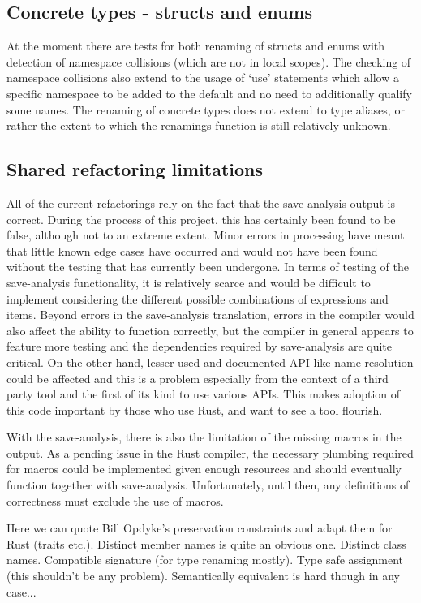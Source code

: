 \subsection{Concrete types - structs and enums}
At the moment there are tests for both renaming of structs and enums with detection of namespace collisions (which are not in local scopes). The checking of namespace collisions also extend to the usage of `use' statements which allow a specific namespace to be added to the default and no need to additionally qualify some names. The renaming of concrete types does not extend to type aliases, or rather the extent to which the renamings function is still relatively unknown.

\subsection{Shared refactoring limitations}
All of the current refactorings rely on the fact that the save-analysis output is correct. During the process of this project, this has certainly been found to be false, although not to an extreme extent. Minor errors in processing have meant that little known edge cases have occurred and would not have been found without the testing that has currently been undergone. In terms of testing of the save-analysis functionality, it is relatively scarce and would be difficult to implement considering the different possible combinations of expressions and items. Beyond errors in the save-analysis translation, errors in the compiler would also affect the ability to function correctly, but the compiler in general appears to feature more testing and the dependencies required by save-analysis are quite critical. On the other hand, lesser used and documented API like name resolution could be affected and this is a problem especially from the context of a third party tool and the first of its kind to use various APIs. This makes adoption of this code important by those who use Rust, and want to see a tool flourish.

With the save-analysis, there is also the limitation of the missing macros in the output. As a pending issue in the Rust compiler, the necessary plumbing required for macros could be implemented given enough resources and should eventually function together with save-analysis. Unfortunately, until then, any definitions of correctness must exclude the use of macros. 

Here we can quote Bill Opdyke's preservation constraints and adapt them for Rust (traits etc.). Distinct member names is quite an obvious one. Distinct class names. Compatible signature (for type renaming mostly). Type safe assignment (this shouldn't be any problem). Semantically equivalent is hard though in any case... 


